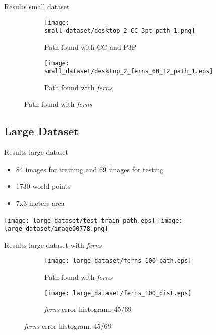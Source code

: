 \begin{frame}[t]{Results small dataset}

  \captionsetup[sub]{labelformat=empty, font=small}
  \begin{figure}	
    \centering
    \begin{subfigure}[t]{.45\linewidth}
      \centering
      \texttt{[image: small\_dataset/desktop\_2\_CC\_3pt\_path\_1.png]}
      \caption{Path found with CC and P3P}		
    \end{subfigure}
    \hfill
    \begin{subfigure}[t]{.45\linewidth}
      \centering
      \texttt{[image: small\_dataset/desktop\_2\_ferns\_60\_12\_path\_1.eps]}
      \caption{Path found with \textit{ferns}}		
    \end{subfigure}
  \end{figure}

\end{frame}

\subsection{Large Dataset}
\label{sub:large_dataset}


\begin{frame}[t]{Results large dataset}
  \begin{itemize}
    \item 84 images for training and 69 images for testing
    \item 1730 world points
    \item 7x3 meters area 
  \end{itemize}
      \texttt{[image: large\_dataset/test\_train\_path.eps]}
      \texttt{[image: large\_dataset/image00778.png]}
  
\end{frame}

\begin{frame}[t]{Results large dataset with \textit{ferns}}

  \captionsetup[sub]{labelformat=empty, font=small}
  \begin{figure}	
    \centering
    \begin{subfigure}[t]{.45\linewidth}
      \centering
        \texttt{[image: large\_dataset/ferns\_100\_path.eps]}
      \caption{Path found with \textit{ferns}}		
    \end{subfigure}
    \hfill
    \begin{subfigure}[t]{.45\linewidth}
      \centering
      \texttt{[image: large\_dataset/ferns\_100\_dist.eps]}
      \caption{\textit{ferns} error histogram. 45/69}		
    \end{subfigure}
  \end{figure}

\end{frame}

